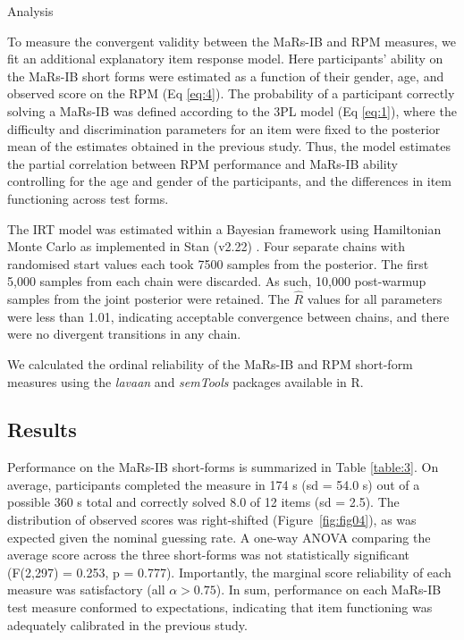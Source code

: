 \documentclass[a4paper,man,natbib]{apa6}
\makeatletter
\renewcommand{\subsubsection}{\@startsection{subsubsection}{3}
  {\z@}%
  {\b@level@two@skip}{\e@level@two@skip}%
  {\normalfont\normalsize\bfseries}}
\makeatother
\begin{document}
\subsubsection{Analysis}

To measure the convergent validity between the MaRs-IB and RPM measures, we fit an additional explanatory item response model. Here participants' ability on the MaRs-IB short forms were estimated as a function of their gender, age, and observed score on the RPM (Eq \ref{eq:4}). The probability of a participant correctly solving a MaRs-IB was defined according to the 3PL model (Eq \ref{eq:1}), where the difficulty and discrimination parameters for an item were fixed to the posterior mean of the estimates obtained in the previous study. Thus, the model estimates the partial correlation between RPM performance and MaRs-IB ability controlling for the age and gender of the participants, and the differences in item functioning across test forms.

The IRT model was estimated within a Bayesian framework using Hamiltonian Monte Carlo as implemented in Stan (v2.22) \citep{carpenter2017stan}. Four separate chains with randomised start values each took 7500 samples from the posterior. The first 5,000 samples from each chain were discarded. As such, 10,000 post-warmup samples from the joint posterior were retained. The $\hat{R}$ values for all parameters were less than 1.01, indicating acceptable convergence between chains, and there were no divergent transitions in any chain. 

We calculated the ordinal reliability of the MaRs-IB and RPM short-form measures using the \textit{lavaan} \citep{lavaan} and \textit{semTools} \citep{semtools} packages available in R.

\subsection{Results}

Performance on the MaRs-IB short-forms is summarized in Table \ref{table:3}. On average, participants completed the measure in 174 s (sd = 54.0 s) out of a possible 360 s total and correctly solved 8.0 of 12 items (sd = 2.5). The distribution of observed scores was right-shifted (Figure~\ref{fig:fig04}), as was expected given the nominal guessing rate. A one-way ANOVA comparing the average score across the three short-forms was not statistically significant (F(2,297) = 0.253, p = 0.777). Importantly, the marginal score reliability of each measure was satisfactory (all $\alpha > 0.75$). In sum, performance on each MaRs-IB test measure conformed to expectations, indicating that item functioning was adequately calibrated in the previous study.
\end{document}
